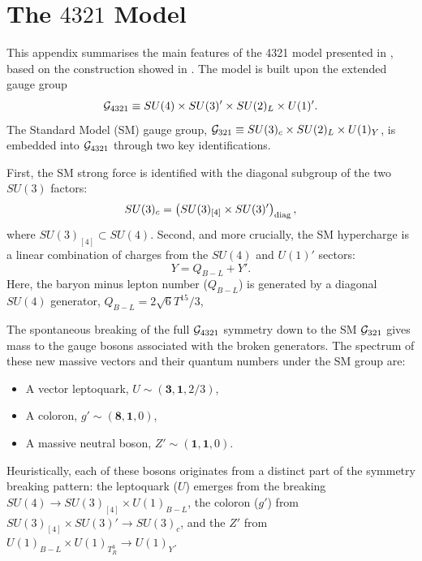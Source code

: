 \chapter{The $4321$ Model}
\label{sec:4321}

This appendix summarises the main features of the 4321 model presented in \cite{DiLuzio:2017vat}, based on the construction showed in \cite{DiLuzio2018}. The model is built upon the extended gauge group
\[
\mathcal{G}_{\rm 4321} \equiv SU(4) \times SU(3)' \times SU(2)_L \times U(1)'.
\]
The Standard Model (SM) gauge group, $\mathcal{G}_{\rm 321} \equiv SU(3)_c \times SU(2)_L \times U(1)_Y$, is embedded into $\mathcal{G}_{\rm 4321}$ through two key identifications.

First, the SM strong force is identified with the diagonal subgroup of the two $SU(3)$ factors:
\begin{equation}
SU(3)_c = \left( SU(3)_{[4]} \times SU(3)' \right)_{\rm diag},
\end{equation}
where $SU(3)_{[4]} \subset SU(4)$. Second, and more crucially, the SM hypercharge is a linear combination of charges from the $SU(4)$ and $U(1)'$ sectors:
\begin{equation}
Y = Q_{B-L} + Y'.
\end{equation}
Here, the baryon minus lepton number ($Q_{B-L}$) is generated by a diagonal $SU(4)$ generator, $Q_{B-L} = 2\sqrt{6} T^{15}/3$, 


The spontaneous breaking of the full $\mathcal{G}_{\rm 4321}$ symmetry down to the SM $\mathcal{G}_{\rm 321}$ gives mass to the gauge bosons associated with the broken generators. The spectrum of these new massive vectors and their quantum numbers under the SM group are:
\begin{itemize}
    \item A vector leptoquark, $U \sim (\mathbf{3},\mathbf{1},2/3)$,
    \item A coloron, $g' \sim (\mathbf{8},\mathbf{1},0)$,
    \item A massive neutral boson, $Z' \sim (\mathbf{1},\mathbf{1},0)$.
\end{itemize}
Heuristically, each of these bosons originates from a distinct part of the symmetry breaking pattern: the leptoquark ($U$) emerges from the breaking $SU(4)\to SU(3)_{[4]}\times U(1)_{B-L}$, the coloron ($g'$) from $SU(3)_{[4]}\times SU(3)'\to SU(3)_c$, and the $Z'$ from $U(1)_{B-L}\times U(1)_{T_R^3}\to U(1)_Y$.
